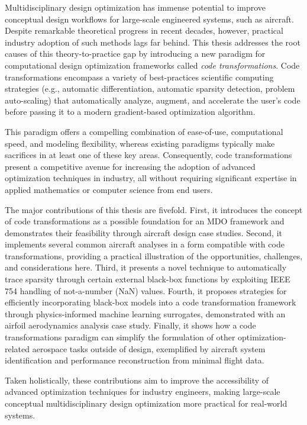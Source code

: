 Multidisciplinary design optimization has immense potential to improve conceptual design workflows for large-scale engineered systems, such as aircraft. Despite remarkable theoretical progress in recent decades, however, practical industry adoption of such methods lags far behind. This thesis addresses the root causes of this theory-to-practice gap by introducing a new paradigm for computational design optimization frameworks called \textit{code transformations}. Code transformations encompass a variety of best-practices scientific computing strategies (e.g., automatic differentiation, automatic sparsity detection, problem auto-scaling) that automatically analyze, augment, and accelerate the user's code before passing it to a modern gradient-based optimization algorithm.

This paradigm offers a compelling combination of ease-of-use, computational speed, and modeling flexibility, whereas existing paradigms typically make sacrifices in at least one of these key areas. Consequently, code transformations present a competitive avenue for increasing the adoption of advanced optimization techniques in industry, all without requiring significant expertise in applied mathematics or computer science from end users.

The major contributions of this thesis are fivefold. First, it introduces the concept of code transformations as a possible foundation for an MDO framework and demonstrates their feasibility through aircraft design case studies. Second, it implements several common aircraft analyses in a form compatible with code transformations, providing a practical illustration of the opportunities, challenges, and considerations here. Third, it presents a novel technique to automatically trace sparsity through certain external black-box functions by exploiting IEEE 754 handling of not-a-number (NaN) values. Fourth, it proposes strategies for efficiently incorporating black-box models into a code transformation framework through physics-informed machine learning surrogates, demonstrated with an airfoil aerodynamics analysis case study. Finally, it shows how a code transformations paradigm can simplify the formulation of other optimization-related aerospace tasks outside of design, exemplified by aircraft system identification and performance reconstruction from minimal flight data.

Taken holistically, these contributions aim to improve the accessibility of advanced optimization techniques for industry engineers, making large-scale conceptual multidisciplinary design optimization more practical for real-world systems.